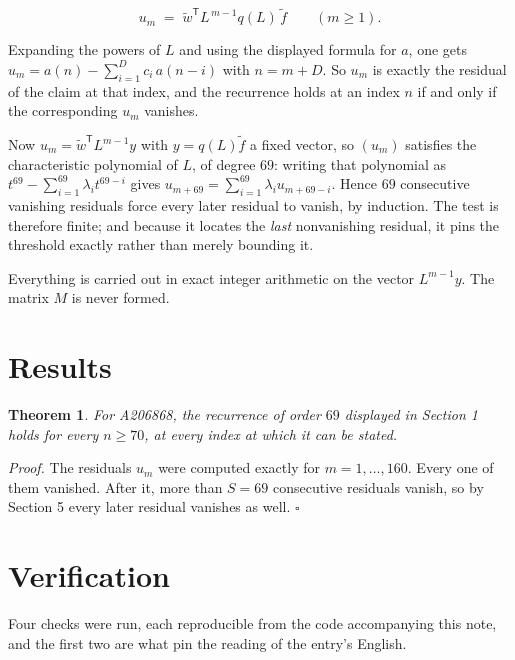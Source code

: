 \documentclass[11pt]{article}
\newtheorem{theorem}{Theorem}
\theoremstyle{definition}
\begin{document}
\[u_m \;=\; \tilde w^{\mathsf T} L^{\,m-1} q(L)\,\tilde f \qquad (m \ge 1).\]

Expanding the powers of $L$ and using the displayed formula for $a$, one gets $u_m = a(n) - \sum_{i=1}^{D} c_i\,a(n-i)$ with $n = m + D$. So $u_m$ is exactly the residual of the claim at that index, and the recurrence holds at an index $n$ if and only if the corresponding $u_m$ vanishes.

Now $u_m = \tilde w^{\mathsf T} L^{m-1} y$ with $y = q(L)\tilde f$ a fixed vector, so $(u_m)$ satisfies the characteristic polynomial of $L$, of degree $69$: writing that polynomial as $t^{69} - \sum_{i=1}^{69} \lambda_i t^{69-i}$ gives $u_{m+69} = \sum_{i=1}^{69} \lambda_i u_{m+69-i}$. Hence $69$ consecutive vanishing residuals force every later residual to vanish, by induction. The test is therefore finite; and because it locates the {\itshape last} nonvanishing residual, it pins the threshold exactly rather than merely bounding it.

Everything is carried out in exact integer arithmetic on the vector $L^{m-1}y$. The matrix $M$ is never formed.

\section{Results}

\begin{theorem} For A206868, the recurrence of order $69$ displayed in Section 1 holds for every $n \ge 70$, at every index at which it can be stated.\end{theorem}

{\itshape Proof.} The residuals $u_m$ were computed exactly for $m = 1,\dots,160$. Every one of them vanished. After it, more than $S = 69$ consecutive residuals vanish, so by Section 5 every later residual vanishes as well. $\square$

\section{Verification}

Four checks were run, each reproducible from the code accompanying this note, and the first two are what pin the reading of the entry's English.
\end{document}
